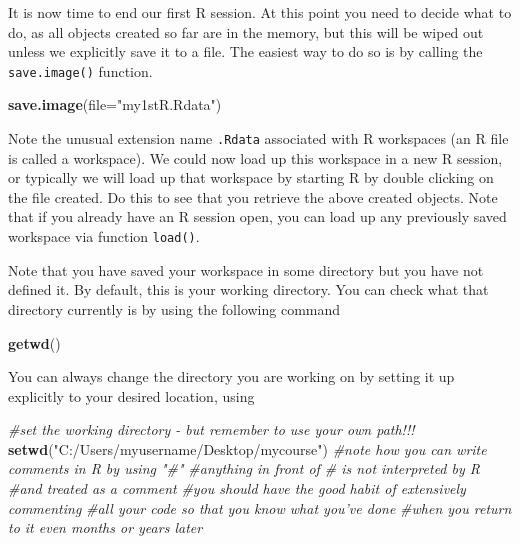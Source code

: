 \documentclass[]{book}
\newenvironment{Shaded}{\begin{snugshade}}{\end{snugshade}}
\newcommand{\KeywordTok}[1]{\textcolor[rgb]{0.13,0.29,0.53}{\textbf{#1}}}
\newcommand{\DataTypeTok}[1]{\textcolor[rgb]{0.13,0.29,0.53}{#1}}
\newcommand{\StringTok}[1]{\textcolor[rgb]{0.31,0.60,0.02}{#1}}
\newcommand{\CommentTok}[1]{\textcolor[rgb]{0.56,0.35,0.01}{\textit{#1}}}
\newcommand{\NormalTok}[1]{#1}
\theoremstyle{definition}
\theoremstyle{definition}
\theoremstyle{remark}
\begin{document}
It is now time to end our first R session. At this point you need to
decide what to do, as all objects created so far are in the memory, but
this will be wiped out unless we explicitly save it to a file. The
easiest way to do so is by calling the \texttt{save.image()} function.

\begin{Shaded}
\begin{Highlighting}[]
\KeywordTok{save.image}\NormalTok{(}\DataTypeTok{file=}\StringTok{"my1stR.Rdata"}\NormalTok{)}
\end{Highlighting}
\end{Shaded}

Note the unusual extension name \texttt{.Rdata} associated with R
workspaces (an R file is called a workspace). We could now load up this
workspace in a new R session, or typically we will load up that
workspace by starting R by double clicking on the file created. Do this
to see that you retrieve the above created objects. Note that if you
already have an R session open, you can load up any previously saved
workspace via function \texttt{load()}.

Note that you have saved your workspace in some directory but you have
not defined it. By default, this is your working directory. You can
check what that directory currently is by using the following command

\begin{Shaded}
\begin{Highlighting}[]
\KeywordTok{getwd}\NormalTok{()}
\end{Highlighting}
\end{Shaded}

You can always change the directory you are working on by setting it up
explicitly to your desired location, using

\begin{Shaded}
\begin{Highlighting}[]
\CommentTok{#set the working directory - but remember to use your own path!!!}
\KeywordTok{setwd}\NormalTok{(}\StringTok{"C:/Users/myusername/Desktop/mycourse"}\NormalTok{)}
\CommentTok{#note how you can write comments in R by using "#"}
\CommentTok{#anything in front of # is not interpreted by R}
\CommentTok{#and treated as a comment}
\CommentTok{#you should have the good habit of extensively commenting}
\CommentTok{#all your code so that you know what you've done}
\CommentTok{#when you return to it even months or years later}
\end{Highlighting}
\end{Shaded}
\end{document}

